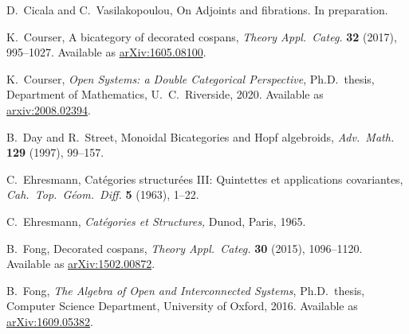 \documentclass[reqno]{amsart}
\begin{document}
\begin{thebibliography}{100}



 D.\ Cicala and C.\ Vasilakopoulou, On Adjoints and fibrations. In preparation.

 K.\ Courser, A bicategory of decorated cospans, \emph{Theory Appl.\ Categ.} \textbf{32} (2017), 995--1027. Available as \href{https://arxiv.org/abs/1605.08100}{arXiv:1605.08100}.

 K.\ Courser, \textsl{Open Systems: a Double Categorical Perspective}, Ph.D.\ thesis, Department of Mathematics, U.\ C.\ Riverside, 2020.  Available as \href{https://arxiv.org/abs/2008.02394}{arxiv:2008.02394}.

 B.\ Day and R.\ Street, Monoidal Bicategories and Hopf algebroids, \textsl{Adv.\ Math.} \textbf{129} (1997), 99--157.



 C.\ Ehresmann, Cat\'egories structur\'ees III: Quintettes et applications covariantes,  \textsl{Cah.\ Top.\ G\'eom.\ Diff.} \textbf{5} (1963), 1--22.

 C.\ Ehresmann, {\sl Cat\'egories et Structures,} Dunod, Paris, 1965.

 B.\ Fong, Decorated cospans, \emph{Theory Appl.\ Categ.} \textbf{30} (2015), 1096--1120.  Available as \href{http://arxiv.org/abs/1502.00872}{arXiv:1502.00872}.

 B.\ Fong, \textsl{The Algebra of Open and Interconnected Systems},
Ph.D.\ thesis, Computer Science Department, University of Oxford, 2016.
Available as \href{https://arxiv.org/abs/1609.05382}{arXiv:1609.05382}.



\end{thebibliography}
\end{document}
